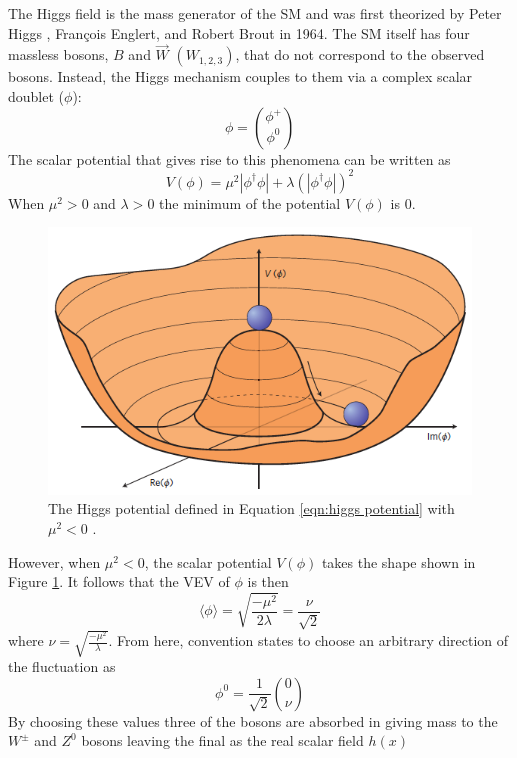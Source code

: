 		The Higgs field is the mass generator of the \gls{SM} and was first theorized by Peter Higgs \cite{Higgs-paper}, François Englert, and Robert Brout \cite{Englert-Brout} in 1964.  The \gls{SM} itself has four massless bosons, $B$ and $\vec{W}$ $(W_{1,2,3})$, that do not correspond to the observed bosons. Instead, the Higgs mechanism couples to them via a complex scalar doublet ($\phi$): 
		\begin{equation}\label{eqn:scal doub} \phi = \binom{\phi^+}{\phi^0}\end{equation}
		The scalar potential that gives rise to this phenomena can be written as 
		\begin{equation}\label{eqn:higgs potential} V(\phi) = \mu^2 |\phi^{\dagger}\phi| + \lambda (|\phi^{\dagger}\phi|)^2\end{equation}
		When $\mu^2>0$ and $\lambda>0$ the minimum of the potential $V(\phi)$ is 0. 
		\begin{figure}[!ht] \centering \includegraphics[width=.7\textwidth,keepaspectratio=true]{chapters/chapter2_theory/images/higgspotential.png} \caption{The Higgs potential defined in Equation \ref{eqn:higgs potential} with $\mu^2<0$ \cite{Higgs-phys}.} \label{fig:higgs-potential}\end{figure}
		However, when $\mu^2<0$, the scalar potential $V(\phi)$ takes the shape shown in Figure \ref{fig:higgs-potential}.
		It follows that the \gls{VEV} of $\phi$ is then 
		\begin{equation}\label{eqn:higgs vev} \langle \phi \rangle = \sqrt{\frac{-\mu^2}{2\lambda}} = \frac{\nu}{\sqrt{2}}	\end{equation}
		where $\nu = \sqrt{\frac{-\mu^2}{\lambda}}$.
		From here, convention states to choose an arbitrary direction of the fluctuation as 
		\begin{equation}\label{eqn:phi zero} \phi^0 = \frac{1}{\sqrt{2}} \binom{0}{\nu} \end{equation}
		By choosing these values three of the bosons are absorbed in giving mass to the $W^{\pm}$ and $Z^0$ bosons leaving the final as the real scalar field $h(x)$
